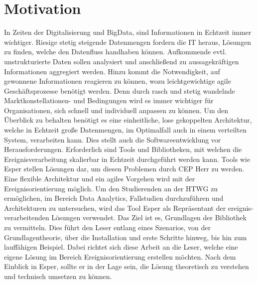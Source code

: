 \chapter{Motivation}
In Zeiten der Digitalisierung und BigData, sind Informationen in Echtzeit immer wichtiger. Riesige stetig steigende Datenmengen fordern die IT heraus, Lösungen zu finden, welche den Datenfluss handhaben können. Aufkommende evtl. unstrukturierte Daten sollen analysiert und anschließend zu aussagekräftigen Informationen aggregiert werden.
Hinzu kommt die Notwendigkeit, auf gewonnene Informationen reagieren zu können, wozu leichtgewichtige agile Geschäftsprozesse benötigt werden.
Denn durch rasch und stetig wandelnde Marktkonstellationen- und Bedingungen wird es immer wichtiger für Organisationen, sich schnell und individuell anpassen zu können. 
\absatz
Um den Überblick zu behalten benötigt es eine einheitliche, lose gekoppelten Architektur, welche in Echtzeit große Datenmengen, im Optimalfall auch in einem verteilten System, verarbeiten kann. Dies stellt auch die Softwareentwicklung vor Herausforderungen.
Erforderlich sind Tools und Bibliotheken, mit welchen die Ereignisverarbeitung skalierbar in Echtzeit durchgeführt werden kann. Tools wie Esper stellen Lösungen dar, um diesen Problemen durch \ac{CEP} Herr zu werden. Eine flexible Architektur und ein agiles Vorgehen wird mit der Ereignisorientierung möglich.
\absatz
Um den Studierenden an der HTWG zu ermöglichen, im Bereich Data Analytics, Fallstudien durchzuführen und Architekturen zu untersuchen, wird das Tool Esper als Repräsentant der ereignis-verarbeitenden Lösungen verwendet.
Das Ziel ist es, Grundlagen der Bibliothek zu vermitteln. Dies führt den Leser entlang eines Szenarios, von der Grundlagentheorie, über die Installation und erste Schritte hinweg, bis hin zum lauffähigen Beispiel.
Dabei richtet sich diese Arbeit an die Leser, welche eine eigene Lösung im Bereich Ereignisorientierung erstellen möchten.
Nach dem Einblick in Esper, sollte er in der Lage sein, die Lösung theoretisch zu verstehen und technisch umsetzen zu können.